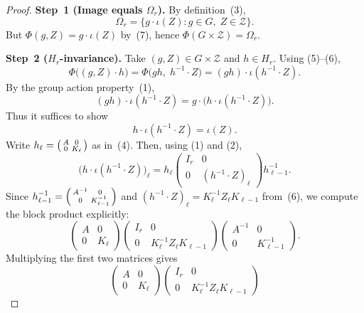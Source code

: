 \documentclass{article}
\theoremstyle{definition}
\begin{document}
\begin{proof}
\textbf{Step~1 (Image equals $\Omega_r$).} By definition~(3),
\[
\Omega_r = \{g \cdot \iota(Z) : g \in G,\; Z \in \mathcal{Z}\}.
\]
But $\Phi(g, Z) = g \cdot \iota(Z)$ by~(7), hence $\Phi(G \times \mathcal{Z}) = \Omega_r$.

\medskip
\textbf{Step~2 ($H_r$-invariance).} Take $(g, Z) \in G \times \mathcal{Z}$ and $h \in H_r$. Using (5)--(6),
\[
\Phi\bigl((g, Z) \cdot h\bigr) = \Phi\bigl(gh,\; h^{-1} \cdot Z\bigr) = (gh) \cdot \iota(h^{-1} \cdot Z).
\]
By the group action property~(1),
\[
(gh) \cdot \iota(h^{-1} \cdot Z) = g \cdot \bigl(h \cdot \iota(h^{-1} \cdot Z)\bigr).
\]
Thus it suffices to show
\begin{equation}\tag{9}
h \cdot \iota(h^{-1} \cdot Z) = \iota(Z).
\end{equation}
Write $h_\ell = \begin{psmallmatrix} A & 0 \\ 0 & K_\ell \end{psmallmatrix}$ as in~(4). Then, using (1) and (2),
\[
\bigl(h \cdot \iota(h^{-1} \cdot Z)\bigr)_\ell
= h_\ell \begin{pmatrix} I_r & 0 \\ 0 & (h^{-1} \cdot Z)_\ell \end{pmatrix} h_{\ell-1}^{-1}.
\]
Since $h_{\ell-1}^{-1} = \begin{psmallmatrix} A^{-1} & 0 \\ 0 & K_{\ell-1}^{-1} \end{psmallmatrix}$ and $(h^{-1} \cdot Z)_\ell = K_\ell^{-1} Z_\ell K_{\ell-1}$ from~(6), we compute the block product explicitly:
\[
\begin{pmatrix} A & 0 \\ 0 & K_\ell \end{pmatrix}
\begin{pmatrix} I_r & 0 \\ 0 & K_\ell^{-1} Z_\ell K_{\ell-1} \end{pmatrix}
\begin{pmatrix} A^{-1} & 0 \\ 0 & K_{\ell-1}^{-1} \end{pmatrix}.
\]
Multiplying the first two matrices gives
\[
\begin{pmatrix} A & 0 \\ 0 & K_\ell \end{pmatrix}
\begin{pmatrix} I_r & 0 \\ 0 & K_\ell^{-1} Z_\ell K_{\ell-1} \end{pmatrix}
\]
\end{proof}
\end{document}
